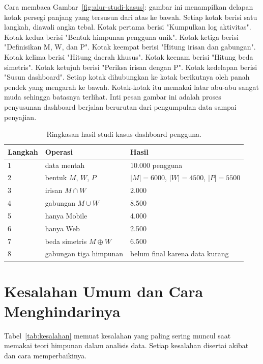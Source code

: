 \documentclass[11pt,a4paper]{article}
\begin{document}
Cara membaca Gambar~\ref{fig:alur-studi-kasus}: gambar ini menampilkan delapan kotak persegi panjang yang tersusun dari atas ke bawah. Setiap kotak berisi satu langkah, diawali angka tebal. Kotak pertama berisi "Kumpulkan log aktivitas". Kotak kedua berisi "Bentuk himpunan pengguna unik". Kotak ketiga berisi "Definisikan M, W, dan P". Kotak keempat berisi "Hitung irisan dan gabungan". Kotak kelima berisi "Hitung daerah khusus". Kotak keenam berisi "Hitung beda simetris". Kotak ketujuh berisi "Periksa irisan dengan P". Kotak kedelapan berisi "Susun dashboard". Setiap kotak dihubungkan ke kotak berikutnya oleh panah pendek yang mengarah ke bawah. Kotak-kotak itu memakai latar abu-abu sangat muda sehingga batasnya terlihat. Inti pesan gambar ini adalah proses penyusunan dashboard berjalan berurutan dari pengumpulan data sampai penyajian.

\begin{table}[H]
	\centering
	\caption{Ringkasan hasil studi kasus dashboard pengguna.}
	\label{tab:studi-kasus}
	\small
	\begin{tabularx}{\textwidth}{l X l}
		\toprule
		Langkah & Operasi & Hasil \\
		\midrule
		1 & data mentah & 10.000 pengguna \\
		2 & bentuk $M$, $W$, $P$ & $|M|=6000$, $|W|=4500$, $|P|=5500$ \\
		3 & irisan $M \cap W$ & 2.000 \\
		4 & gabungan $M \cup W$ & 8.500 \\
		5 & hanya Mobile & 4.000 \\
		6 & hanya Web & 2.500 \\
		7 & beda simetris $M \oplus W$ & 6.500 \\
		8 & gabungan tiga himpunan & belum final karena data kurang \\
		\bottomrule
	\end{tabularx}
\end{table}

\section{Kesalahan Umum dan Cara Menghindarinya}

Tabel~\ref{tab:kesalahan} memuat kesalahan yang paling sering muncul saat memakai teori himpunan dalam analisis data. Setiap kesalahan disertai akibat dan cara memperbaikinya.
\end{document}
